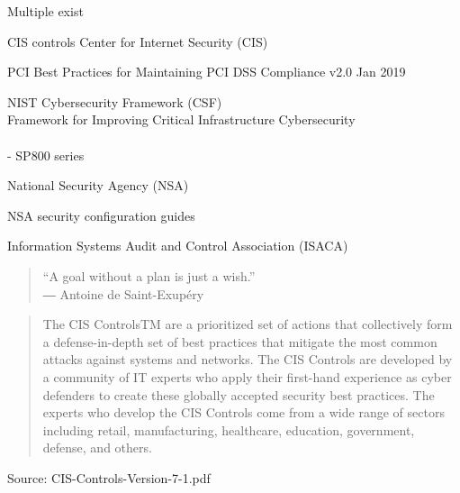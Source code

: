 \documentclass[Screen16to9,17pt]{foils}
\begin{document}
\begin{list1}
\item Multiple exist
\vskip 1cm
\begin{list2}
\item CIS controls Center for Internet Security (CIS) 
\item PCI Best Practices for Maintaining PCI DSS Compliance v2.0 Jan 2019
\item NIST Cybersecurity Framework (CSF)\\
Framework for Improving
Critical Infrastructure Cybersecurity\\ \\
 - SP800 series
\item National Security Agency (NSA)\\
\item NSA security configuration guides\\
\item Information Systems Audit and Control Association (ISACA)\\
\end{list2}
\end{list1}


\begin{quote}
  “A goal without a plan is just a wish.”\\
  ― Antoine de Saint-Exupéry
\end{quote}

\begin{quote}
  The CIS ControlsTM are a prioritized set of actions that collectively form a defense-in-depth set
of best practices that mitigate the most common attacks against systems and networks. The
CIS Controls are developed by a community of IT experts who apply their first-hand experience
as cyber defenders to create these globally accepted security best practices. The experts who
develop the CIS Controls come from a wide range of sectors including retail, manufacturing,
healthcare, education, government, defense, and others.
\end{quote}

Source:  CIS-Controls-Version-7-1.pdf
\end{document}
